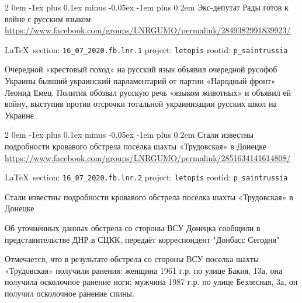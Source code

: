 \documentclass[a4paper,11pt]{extreport}
\makeatletter
\renewcommand\subsection{%
  \clearpage
    \@startsection{subsection}%
    {2}%
    {0em}%
    {-1ex plus 0.1ex minus -0.05ex}%
    {-1em plus 0.2em}%
    {\scshape\bfseries\Large}%
}
\makeatother
\begin{document}
 
  
  
\subsection{Экс-депутат Рады готов к войне с русским языком}
\label{sec:16_07_2020.fb.lnr.1}
\url{https://www.facebook.com/groups/LNRGUMO/permalink/2849382991839923/}

\vspace{0.5cm}
{\ifDEBUG\small\LaTeX~section: \verb|16_07_2020.fb.lnr.1| project: \verb|letopis| rootid: \verb|p_saintrussia|\fi}
\vspace{0.5cm}
  

Очередной «крестовый поход» на русский язык объявил очередной русофоб Украины
бывший украинский парламентарий от партии «Народный фронт» Леонид Емец. Политик
обозвал русскую речь «языком животных» и объявил ей войну, выступив против
отсрочки тотальной украинизации русских школ на Украине. 
 
 
  
 
\subsection{Стали известны подробности кровавого обстрела посёлка шахты «Трудовская» в Донецке}
\label{sec:16_07_2020.fb.lnr.2}
\url{https://www.facebook.com/groups/LNRGUMO/permalink/2851634141614808/}

\vspace{0.5cm}
{\ifDEBUG\small\LaTeX~section: \verb|16_07_2020.fb.lnr.2| project: \verb|letopis| rootid: \verb|p_saintrussia|\fi}
\vspace{0.5cm}

Стали известны подробности кровавого обстрела посёлка шахты «Трудовская» в
Донецке

Об уточнённых данных обстрела со стороны ВСУ Донецка сообщили в
представительстве ДНР в СЦКК, передаёт корреспондент "Донбасс Сегодня"

Отмечается, что в результате обстрела со стороны ВСУ поселка шахты «Трудовская»
получили ранения: женщина 1961 г.р. по улице Бакия, 13а, она получила
осколочное ранение ноги; мужчина 1987 г.р. по улице Безлесная, 3а, он получил
осколочное ранение спины.
\end{document}
